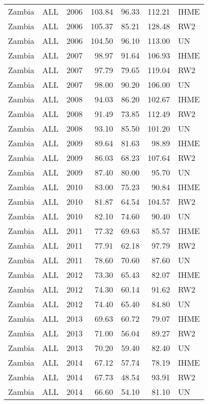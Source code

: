 \begin{longtable}{lllrrrl}
  Zambia & ALL & 2006 & 103.84 & 96.33 & 112.21 & IHME \\ 
  Zambia & ALL & 2006 & 105.37 & 85.21 & 128.48 & RW2 \\ 
  Zambia & ALL & 2006 & 104.50 & 96.10 & 113.00 & UN \\ 
  Zambia & ALL & 2007 & 98.97 & 91.64 & 106.93 & IHME \\ 
  Zambia & ALL & 2007 & 97.79 & 79.65 & 119.04 & RW2 \\ 
  Zambia & ALL & 2007 & 98.00 & 90.20 & 106.00 & UN \\ 
  Zambia & ALL & 2008 & 94.03 & 86.20 & 102.67 & IHME \\ 
  Zambia & ALL & 2008 & 91.49 & 73.85 & 112.49 & RW2 \\ 
  Zambia & ALL & 2008 & 93.10 & 85.50 & 101.20 & UN \\ 
  Zambia & ALL & 2009 & 89.64 & 81.63 & 98.89 & IHME \\ 
  Zambia & ALL & 2009 & 86.03 & 68.23 & 107.64 & RW2 \\ 
  Zambia & ALL & 2009 & 87.40 & 80.00 & 95.70 & UN \\ 
  Zambia & ALL & 2010 & 83.00 & 75.23 & 90.84 & IHME \\ 
  Zambia & ALL & 2010 & 81.87 & 64.54 & 104.57 & RW2 \\ 
  Zambia & ALL & 2010 & 82.10 & 74.60 & 90.40 & UN \\ 
  Zambia & ALL & 2011 & 77.32 & 69.63 & 85.57 & IHME \\ 
  Zambia & ALL & 2011 & 77.91 & 62.18 & 97.79 & RW2 \\ 
  Zambia & ALL & 2011 & 78.60 & 70.60 & 87.60 & UN \\ 
  Zambia & ALL & 2012 & 73.30 & 65.43 & 82.07 & IHME \\ 
  Zambia & ALL & 2012 & 74.30 & 60.14 & 91.62 & RW2 \\ 
  Zambia & ALL & 2012 & 74.40 & 65.40 & 84.80 & UN \\ 
  Zambia & ALL & 2013 & 69.63 & 60.72 & 79.07 & IHME \\ 
  Zambia & ALL & 2013 & 71.00 & 56.04 & 89.27 & RW2 \\ 
  Zambia & ALL & 2013 & 70.20 & 59.40 & 82.40 & UN \\ 
  Zambia & ALL & 2014 & 67.12 & 57.74 & 78.19 & IHME \\ 
  Zambia & ALL & 2014 & 67.73 & 48.54 & 93.91 & RW2 \\ 
  Zambia & ALL & 2014 & 66.60 & 54.10 & 81.10 & UN \\ 

\end{longtable}
